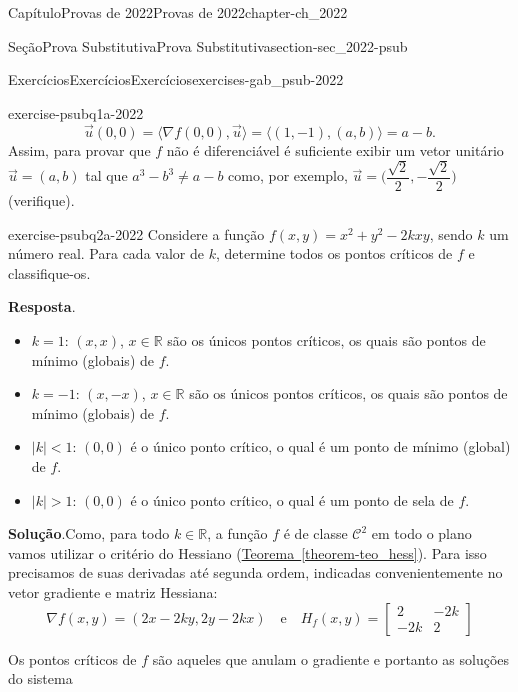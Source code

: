 \documentclass[oneside,10pt,]{book}
\newcommand{\blocktitlefont}{\relax}
\newcommand{\xreffont}{\relax}
\numberwithin{equation}{section}
\newcommand{\R}{\mathbb R}
\begin{document}
\begin{chapterptx}{Capítulo}{Provas de 2022}{}{Provas de 2022}{}{}{chapter-ch_2022}
\begin{sectionptx}{Seção}{Prova Substitutiva}{}{Prova Substitutiva}{}{}{section-sec_2022-psub}
\begin{exercises-subsection-numberless}{Exercícios}{Exercícios}{}{Exercícios}{}{}{exercises-gab_psub-2022}
\begin{divisionexercise}{1}{}{}{exercise-psubq1a-2022}
\begin{equation*}
{\vec{u}}(0,0) = \big\langle \nabla f(0,0), \vec{u}\big\rangle =
\big\langle (1,-1), (a,b)\big\rangle= a-b.
\end{equation*}
Assim, para provar que \(f\) não é diferenciável é suficiente exibir um vetor unitário \(\vec{u}=(a,b)\) tal que \(a^3 - b^3 \neq a
- b\) como, por exemplo, \(\vec{u} = \Big(
\dfrac{\sqrt{2}}{2}, -\dfrac{\sqrt{2}}{2}\Big)\) (verifique).%
\end{divisionexercise}%
\begin{divisionexercise}{2}{}{}{exercise-psubq2a-2022}%
Considere a função \(f(x, y) = x^2 + y^2 - 2kxy\), sendo \(k\) um número real. Para cada valor de \(k\), determine todos os pontos críticos de \(f\) e classifique-os.%
\par\smallskip%
\noindent\textbf{\blocktitlefont Resposta}.\hypertarget{answer-psubq2a-2022-b}{}\quad{}%
\begin{itemize}[label=\textbullet]
\item{}\(k=1\): \((x,x)\), \(x\in\R\) são os únicos pontos críticos, os quais são pontos de mínimo (globais) de \(f\).%
\item{}\(k=-1\): \((x,-x)\), \(x\in\R\) são os únicos pontos críticos, os quais são pontos de mínimo (globais) de \(f\).%
\item{}\(|k|<1\): \((0,0)\) é o único ponto crítico, o qual é um ponto de mínimo (global) de \(f\).%
\item{}\(|k|>1\): \((0,0)\) é o único ponto crítico, o qual é um ponto de sela de \(f\).%
\end{itemize}
%
\par\smallskip%
\noindent\textbf{\blocktitlefont Solução}.\hypertarget{solution-psubq2a-2022-c}{}\quad{}Como, para todo \(k\in\R\), a função \(f\) é de classe \(\mathscr{C}^2\) em todo o plano vamos utilizar o critério do Hessiano (\hyperref[theorem-teo_hess]{Teorema~{\xreffont\ref{theorem-teo_hess}}}). Para isso precisamos de suas derivadas até segunda ordem, indicadas convenientemente no vetor gradiente e matriz Hessiana:%
\begin{equation*}
\nabla f(x,y)=(2x-2ky,2y-2kx)\quad\text{e}\quad H_f(x,y)=
\begin{bmatrix}
2 & -2k\\ -2k & 2
\end{bmatrix}
\end{equation*}
%
\par
Os pontos críticos de \(f\) são aqueles que anulam o gradiente e portanto as soluções do sistema%
\begin{equation*}

\end{equation*}
\end{divisionexercise}
\end{exercises-subsection-numberless}
\end{sectionptx}
\end{chapterptx}
\end{document}
